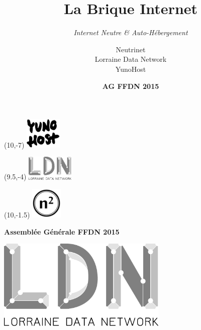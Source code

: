 \documentclass[notes=hide]{beamer}
\date{\textbf{AG FFDN 2015}}
\title{La Brique Internet}
\subtitle{\vspace{10pt}\emph{Internet Neutre \& Auto-Hébergement}}
\author{Neutrinet \\ Lorraine Data Network \\ YunoHost}
\begin{document}
\begin{frame}[t,plain]
\titlepage
  \begin{textblock}{}(10,-7)
    \includegraphics[height=1.5cm]{img2/logo-ynh-black.pdf}
  \end{textblock}
  \begin{textblock}{}(9.5,-4)
    \includegraphics[height=1.2cm]{img2/logoldn}
  \end{textblock}
  \begin{textblock}{}(10,-1.5)
    \includegraphics[height=1.5cm]{img2/logo-neutrinet}
  \end{textblock}
  {\color{black}\textbf{Assemblée Générale FFDN 2015}}
\end{frame}

\watermarkon
\watermarkoff

\begin{frame}[t,plain]
\begin{center}
  \vspace{\fill}
    \includegraphics[width=230pt]{img2/logoldn}
  \vspace{\fill}
\end{center}
\end{frame}

\begin{frame}[t,plain]
  \begin{center}
    \vspace{\fill}
    \vspace{\fill}
  \end{center}
\end{frame}
\end{document}
